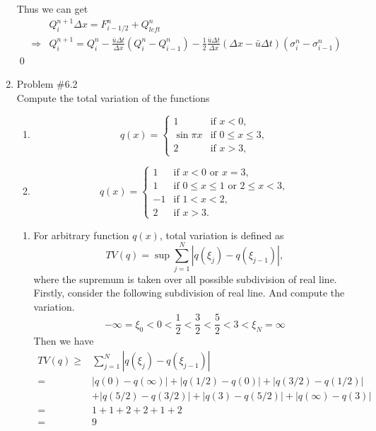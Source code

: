 \documentclass[11pt]{article}
\begin{document}
\begin{enumerate}
            Thus we can get
            \begin{align*}
            &Q_i^{n+1} \Delta x= F_{i-1/2}^n + Q_{left}^n\\
            \Rightarrow &
            Q_i^{n+1}=Q_i^n-\frac{\bar{u}\Delta t}{\Delta x}(Q_i^n-Q_{i-1}^n)-\frac{1}{2}\frac{\bar{u}\Delta t}{\Delta x}(\Delta x -\bar{u}\Delta t)(\sigma_i^n-\sigma_{i-1}^n)
			\end{align*}             
\qed
\newpage
    \item Problem \#6.2 \\
            Compute the total variation of the functions
            \begin{enumerate}
            	\item
            		\[
            		q(x)=\begin{cases}1 & \text{if } x<0,\\ \sin{\pi x} & \text{if } 0\leq x\leq3, \\2 & \text{if } x>3,\end{cases}
            		\]
            	\item
            		\[
            		q(x)=\begin{cases}1 &\text{if }x<0 \text{ or } x=3,\\1 &\text{if }0\leq x\leq 1\text{ or }2\leq x<3,\\-1 &\text{if } 1<x<2,\\2 &\text{if } x>3.\end{cases}
            		\]
            \end{enumerate}

        \vskip 5pt
        \vskip 5pt
				
			\begin{enumerate}
			
				\item
					For arbitrary function $q(x)$, total variation is defined as 
					\[
					TV(q)=\sup\sum_{j=1}^N|q(\xi_j)-q(\xi_{j-1})|,
					\]
					where the supremum is taken over all possible subdivision of real line.\\
					
					Firstly, consider the following subdivision of real line. And compute the variation.
					\[
					-\infty=\xi_0<0<\frac{1}{2}<\frac{3}{2}<\frac{5}{2}<3<\xi_N=\infty
					\]
					Then we have
					\begin{align*}
					TV(q)\geq &\sum_{j=1}^N |q(\xi_j)-q(\xi_{j-1})|\\
					= &|q(0)-q(\infty)|+|q(1/2)-q(0)|+|q(3/2)-q(1/2)|\\
					&+|q(5/2)-q(3/2)|+|q(3)-q(5/2)|+|q(\infty)-q(3)|\\
					= &1+1+2+2+1+2\\
					=&9
					\end{align*}
					

\end{enumerate}
\end{enumerate}
\end{document}
